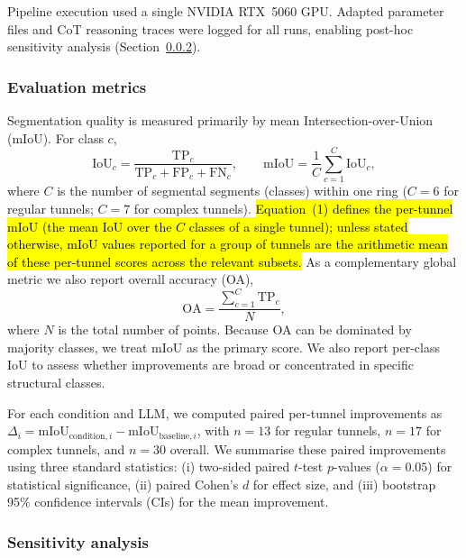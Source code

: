 \documentclass[a4paper,fleqn]{cas-dc}
\begin{document}
{Pipeline execution used a single NVIDIA RTX~5060 GPU. Adapted parameter files and CoT reasoning traces were logged for all runs, enabling post-hoc sensitivity analysis (Section~\ref{sec:sensitivity-method}).

\subsubsection{Evaluation metrics}\label{sec:metrics}

Segmentation quality is measured primarily by mean Intersection-over-Union (mIoU). For class $c$,
\begin{equation}
\text{IoU}_c = \frac{\text{TP}_c}{\text{TP}_c + \text{FP}_c + \text{FN}_c}, \qquad
\text{mIoU} = \frac{1}{C} \sum_{c=1}^{C} \text{IoU}_c,
\end{equation}
where $C$ is the number of segmental segments (classes) within one ring ($C=6$ for regular tunnels; $C=7$ for complex tunnels). \hl{Equation~(1) defines the per-tunnel mIoU (the mean IoU over the $C$ classes of a single tunnel); unless stated otherwise, mIoU values reported for a group of tunnels are the arithmetic mean of these per-tunnel scores across the relevant subsets.} As a complementary global metric we also report overall accuracy (OA),
\begin{equation}
\text{OA} = \frac{\sum_{c=1}^{C} \text{TP}_c}{N},
\end{equation}
where $N$ is the total number of points. Because OA can be dominated by majority classes, we treat mIoU as the primary score. We also report per-class IoU to assess whether improvements are broad or concentrated in specific structural classes.

For each condition and LLM, we computed paired per-tunnel improvements as $\Delta_i = \mathrm{mIoU}_{\text{condition},i} - \mathrm{mIoU}_{\text{baseline},i}$, with $n=13$ for regular tunnels, $n=17$ for complex tunnels, and $n=30$ overall. We summarise these paired improvements using three standard statistics: (i) two-sided paired $t$-test $p$-values ($\alpha = 0.05$) for statistical significance, (ii) paired Cohen's \mbox{$d$} for effect size, and (iii) bootstrap 95\% confidence intervals (CIs) for the mean improvement.

\subsubsection{Sensitivity analysis}\label{sec:sensitivity-method}

}
\end{document}
